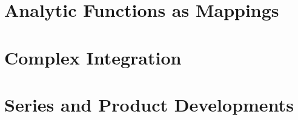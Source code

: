 \documentclass[a4paper]{article}
\begin{document}
\vspace{1\baselineskip}



\vspace{1\baselineskip}



\vspace{1\baselineskip}



\vspace{1\baselineskip}



\pagebreak

\section{Analytic Functions as Mappings}

\vspace{1\baselineskip}



\vspace{1\baselineskip}



\pagebreak

\section{Complex Integration}

\vspace{1\baselineskip}



\vspace{1\baselineskip}



\vspace{1\baselineskip}



\vspace{1\baselineskip}



\vspace{1\baselineskip}



\pagebreak

\section{Series and Product Developments}

\vspace{1\baselineskip}



\pagebreak


\end{document}

